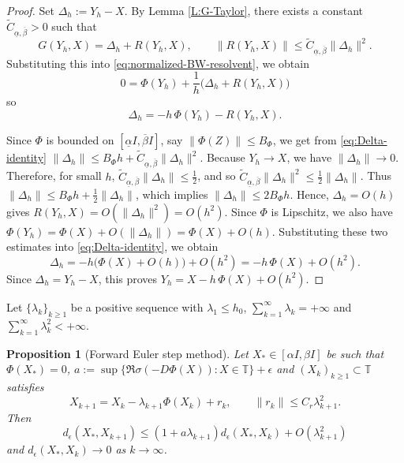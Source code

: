 \documentclass[12pt,reqno]{amsart}
\newtheorem{proposition}[theorem]{Proposition}
\begin{document}
\begin{proof}
Set
$\Delta_h := Y_h - X$.
By Lemma \ref{L:G-Taylor}, there exists a constant
\( \widetilde C_{\underline{\alpha},\overline{\beta}} > 0 \) such that
\[
G(Y_h,X) = \Delta_h + R(Y_h,X),
\qquad
\| R(Y_h,X) \| \le \widetilde C_{\underline{\alpha},\overline{\beta}} \| \Delta_h \|^2.
\]
Substituting this into \eqref{eq:normalized-BW-resolvent}, we obtain
\[
0 = \Phi(Y_h) + \frac{1}{h} \bigl( \Delta_h + R(Y_h,X) \bigr)
\]
so
\begin{equation}\label{eq:Delta-identity}
\Delta_h = -h \, \Phi(Y_h) - R(Y_h,X).
\end{equation}

Since \(\Phi\) is bounded on \( [\underline{\alpha} I, \overline{\beta} I] \),
say \( \| \Phi(Z) \| \le B_{\Phi} \), we get
from \eqref{eq:Delta-identity}
$\| \Delta_h \|
\le B_{\Phi} h + \widetilde C_{\underline{\alpha},\overline{\beta}} \| \Delta_h \|^2$.
Because \( Y_h \to X \), we have \( \| \Delta_h \| \to 0 \).
Therefore, for small \(h\),
$\widetilde C_{\underline{\alpha},\overline{\beta}} \| \Delta_h \| \le \frac12$,
and so
$\widetilde C_{\underline{\alpha},\overline{\beta}} \| \Delta_h \|^2 \le \frac12 \| \Delta_h \|$.
Thus
$\| \Delta_h \| \le B_{\Phi} h + \frac12 \| \Delta_h \|$,
which implies
$\| \Delta_h \| \le 2B_{\Phi} h$.
Hence,
$\Delta_h = O(h)$ gives
$R(Y_h,X) = O(\| \Delta_h \|^2) = O(h^2)$.
Since \(\Phi\) is Lipschitz, we also have
$\Phi(Y_h) = \Phi(X) + O(\| \Delta_h \|) = \Phi(X) + O(h)$.
Substituting these two estimates into \eqref{eq:Delta-identity}, we obtain
\[
\Delta_h = -h \bigl( \Phi(X) + O(h) \bigr) + O(h^2)
= -h \, \Phi(X) + O(h^2).
\]
Since \( \Delta_h = Y_h-X \), this proves
$Y_h = X - h \, \Phi(X) + O(h^2)$.
\end{proof}

Let $\{\lambda_k\}_{k \ge 1}$ be a positive sequence with $\lambda_1 \leq h_0$, $\sum_{k=1}^\infty \lambda_k = +\infty$ and $\sum_{k=1}^\infty \lambda_k^2 < +\infty$.

\begin{proposition}[Forward Euler step method]\label{P:monotoneResolvent}
Let $X_* \in [\alpha I,\beta I]$ be such that $\Phi(X_*)=0$, $a := \sup\{ \Re\sigma(-D\Phi(X)): X \in \mathbb{T} \} + \epsilon$ and
\( (X_k)_{k\ge1} \subset \mathbb{T} \) satisfies
\begin{equation}\label{Resolvent}
X_{k+1} = X_k - \lambda_{k+1} \Phi(X_k) + r_k,
\qquad
\| r_k \| \le C_r \lambda_{k+1}^2.
\end{equation}
Then
\begin{equation*}\label{eq1:P:monotoneResolvent}
d_\epsilon(X_*,X_{k+1}) \leq \left( 1 + a \lambda_{k+1} \right) d_\epsilon(X_*,X_{k}) + O \left( \lambda_{k+1}^2 \right)
\end{equation*}
and $d_\epsilon(X_*,X_{k}) \to 0$ as $k \to \infty$.
\end{proposition}
\end{document}
